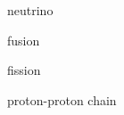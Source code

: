 \documentclass{article}
\begin{document}
\gls{neutrino}

\gls{fusion}

\gls{fission}

\gls{proton-proton chain}

\clearpage

\printglossaries
\end{document}
